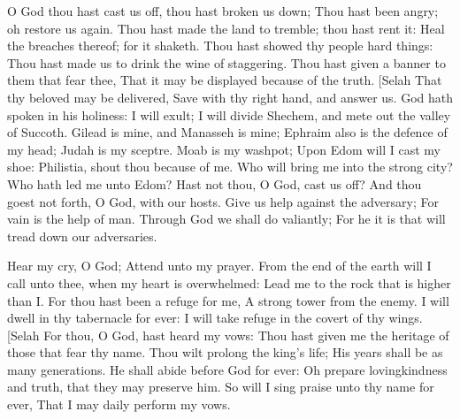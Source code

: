 O God thou hast cast us off, thou hast broken us down; Thou hast been angry; oh restore us again.  Thou hast made the land to tremble; thou hast rent it: Heal the breaches thereof; for it shaketh.  Thou hast showed thy people hard things: Thou hast made us to drink the wine of staggering.  Thou hast given a banner to them that fear thee, That it may be displayed because of the truth. [Selah  That thy beloved may be delivered, Save with thy right hand, and answer us.  God hath spoken in his holiness: I will exult; I will divide Shechem, and mete out the valley of Succoth.  Gilead is mine, and Manasseh is mine; Ephraim also is the defence of my head; Judah is my sceptre.  Moab is my washpot; Upon Edom will I cast my shoe: Philistia, shout thou because of me.  Who will bring me into the strong city? Who hath led me unto Edom?  Hast not thou, O God, cast us off? And thou goest not forth, O God, with our hosts.  Give us help against the adversary; For vain is the help of man.  Through God we shall do valiantly; For he it is that will tread down our adversaries. 

Hear my cry, O God; Attend unto my prayer.  From the end of the earth will I call unto thee, when my heart is overwhelmed: Lead me to the rock that is higher than I.  For thou hast been a refuge for me, A strong tower from the enemy.  I will dwell in thy tabernacle for ever: I will take refuge in the covert of thy wings. [Selah  For thou, O God, hast heard my vows: Thou hast given me the heritage of those that fear thy name.  Thou wilt prolong the king’s life; His years shall be as many generations.  He shall abide before God for ever: Oh prepare lovingkindness and truth, that they may preserve him.  So will I sing praise unto thy name for ever, That I may daily perform my vows. 

